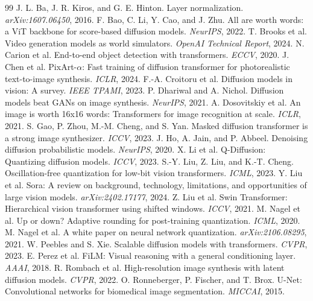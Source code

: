 \documentclass[10pt,a4paper]{article}
\begin{document}
\begin{thebibliography}{99}
 J. L. Ba, J. R. Kiros, and G. E. Hinton. Layer normalization. \textit{arXiv:1607.06450}, 2016.
 F. Bao, C. Li, Y. Cao, and J. Zhu. All are worth words: a ViT backbone for score-based diffusion models. \textit{NeurIPS}, 2022.
 T. Brooks et al. Video generation models as world simulators. \textit{OpenAI Technical Report}, 2024.
 N. Carion et al. End-to-end object detection with transformers. \textit{ECCV}, 2020.
 J. Chen et al. PixArt-$\alpha$: Fast training of diffusion transformer for photorealistic text-to-image synthesis. \textit{ICLR}, 2024.
 F.-A. Croitoru et al. Diffusion models in vision: A survey. \textit{IEEE TPAMI}, 2023.
 P. Dhariwal and A. Nichol. Diffusion models beat GANs on image synthesis. \textit{NeurIPS}, 2021.
 A. Dosovitskiy et al. An image is worth 16x16 words: Transformers for image recognition at scale. \textit{ICLR}, 2021.
 S. Gao, P. Zhou, M.-M. Cheng, and S. Yan. Masked diffusion transformer is a strong image synthesizer. \textit{ICCV}, 2023.
 J. Ho, A. Jain, and P. Abbeel. Denoising diffusion probabilistic models. \textit{NeurIPS}, 2020.
 X. Li et al. Q-Diffusion: Quantizing diffusion models. \textit{ICCV}, 2023.
 S.-Y. Liu, Z. Liu, and K.-T. Cheng. Oscillation-free quantization for low-bit vision transformers. \textit{ICML}, 2023.
 Y. Liu et al. Sora: A review on background, technology, limitations, and opportunities of large vision models. \textit{arXiv:2402.17177}, 2024.
 Z. Liu et al. Swin Transformer: Hierarchical vision transformer using shifted windows. \textit{ICCV}, 2021.
 M. Nagel et al. Up or down? Adaptive rounding for post-training quantization. \textit{ICML}, 2020.
 M. Nagel et al. A white paper on neural network quantization. \textit{arXiv:2106.08295}, 2021.
 W. Peebles and S. Xie. Scalable diffusion models with transformers. \textit{CVPR}, 2023.
 E. Perez et al. FiLM: Visual reasoning with a general conditioning layer. \textit{AAAI}, 2018.
 R. Rombach et al. High-resolution image synthesis with latent diffusion models. \textit{CVPR}, 2022.
 O. Ronneberger, P. Fischer, and T. Brox. U-Net: Convolutional networks for biomedical image segmentation. \textit{MICCAI}, 2015.

\end{thebibliography}
\end{document}
